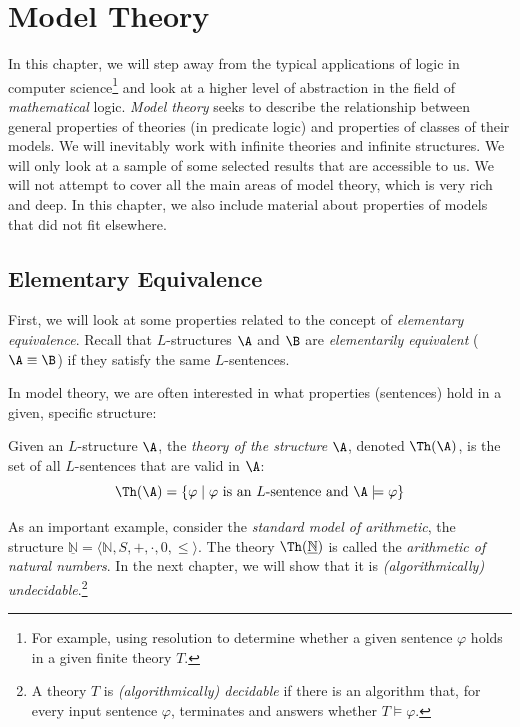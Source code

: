 \chapter{Model Theory}\label{chapter:model-theory}

In this chapter, we will step away from the typical applications of logic in computer science\footnote{For example, using resolution to determine whether a given sentence $\varphi$ holds in a given finite theory $T$.} and look at a higher level of abstraction in the field of \emph{mathematical} logic. \emph{Model theory} seeks to describe the relationship between general properties of theories (in predicate logic) and properties of classes of their models. We will inevitably work with infinite theories and infinite structures. We will only look at a sample of some selected results that are accessible to us. We will not attempt to cover all the main areas of model theory, which is very rich and deep. In this chapter, we also include material about properties of models that did not fit elsewhere.

\section{Elementary Equivalence}

First, we will look at some properties related to the concept of \emph{elementary equivalence}. Recall that $L$-structures $\A$ and $\B$ are \emph{elementarily equivalent} ($\A\equiv \B$) if they satisfy the same $L$-sentences.

In model theory, we are often interested in what properties (sentences) hold in a given, specific structure:

\begin{definition}
Given an $L$-structure $\A$, the \emph{theory of the structure} $\A$, denoted $\Th(\A)$, is the set of all $L$-sentences that are valid in $\A$:
$$
\Th(\A)=\{\varphi\mid\varphi \text{ is an $L$-sentence and } \A\models\varphi\}
$$
\end{definition}

\begin{example}
As an important example, consider the \emph{standard model of arithmetic}, the structure $\underline{\mathbb{N}}=\langle\mathbb{N},S,+,\cdot,0,\le\rangle$. The theory $\Th(\underline{\mathbb{N}})$ is called the \emph{arithmetic of natural numbers}. In the next chapter, we will show that it is \emph{(algorithmically) undecidable}.\footnote{A theory $T$ is \emph{(algorithmically) decidable} if there is an algorithm that, for every input sentence $\varphi$, terminates and answers whether $T\models\varphi$.}
\end{example}

